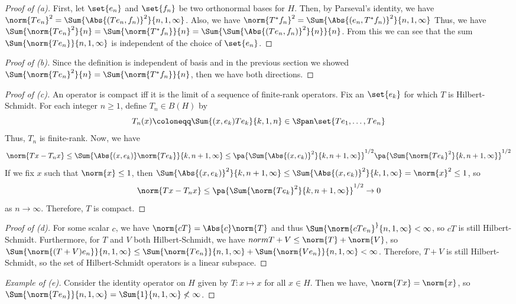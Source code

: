 \documentclass[12pt,letterpaper,twoside]{hmcpset}
\begin{document}
\begin{solution}
  \begin{proof}[Proof of (a)]
    First, let $\set{e_n}$ and $\set{f_n}$ be two orthonormal bases for $H$.
    Then, by Parseval's identity, we have $\norm{Te_n}^2 = \Sum{\Abs{(Te_n,f_n)}^2}{n,1,\infty}$.
    Also, we have $\norm{T^*f_n}^2 = \Sum{\Abs{(e_n,T^*f_n)}^2}{n,1,\infty}$
    Thus, we have $\Sum{\norm{Te_n}^2}{n} = \Sum{\norm{T^*f_n}}{n} = \Sum{\Sum{\Abs{(Te_n,f_n)}^2}{n}}{n}$.
    From this we can see that the sum $\Sum{\norm{Te_n}}{n,1,\infty}$ is independent of the choice of $\set{e_n}$.
  \end{proof}
  \begin{proof}[Proof of (b)]
    Since the definition is independent of basis and in the previous section we showed  $\Sum{\norm{Te_n}^2}{n} = \Sum{\norm{T^*f_n}}{n}$, then we have both directions.
  \end{proof}
  \begin{proof}[Proof of (c)]
    An operator is compact iff it is the limit of a sequence of finite-rank operators.
    Fix an $\set{e_k}$ for which $T$ is Hilbert-Schmidt.
    For each integer $n \geq 1$, define $T_n \in B(H)$ by \[
    T_n(x) \coloneqq \Sum{(x,e_k)Te_k}{k,1,n} \in \Span\set{Te_1,\dotsc,Te_n}
    \]
    Thus, $T_n$ is finite-rank.
    Now, we have \[
    \norm{Tx - T_nx} \leq \Sum{\Abs{(x,e_k)}\norm{Te_k}}{k,n+1,\infty} \leq \pa{\Sum{\Abs{(x,e_k)}^2}{k,n+1,\infty}}^{1/2} \pa{\Sum{\norm{Te_k}^2}{k,n+1,\infty}}^{1/2}
    \]
    If we fix $x$ such that $\norm{x} \leq 1$, then $\Sum{\Abs{(x,e_k)}^2}{k,n+1,\infty} \leq \Sum{\Abs{(x,e_k)}^2}{k,1,\infty} = \norm{x}^2 \leq 1$, so \[
    \norm{Tx - T_nx} \leq \pa{\Sum{\norm{Te_k}^2}{k,n+1,\infty}}^{1/2} \to 0
    \]
    as $n \to \infty$.
    Therefore, $T$ is compact.
  \end{proof}
  \begin{proof}[Proof of (d)]
    For some scalar $c$, we have $\norm{cT}=\Abs{c}\norm{T}$ and thus $\Sum{\norm{cTe_n}^}{n,1,\infty} < \infty$, so $cT$ is still Hilbert-Schmidt.
    Furthermore, for $T$ and $V$ both Hilbert-Schmidt, we have $norm{T+V} \leq \norm{T} + \norm{V}$, so $\Sum{\norm{(T+V)e_n}}{n,1,\infty} \leq \Sum{\norm{Te_n}}{n,1,\infty} + \Sum{\norm{Ve_n}}{n,1,\infty} < \infty$.
    Therefore, $T + V$ is still Hilbert-Schmidt, so the set of Hilbert-Schmidt operators is a linear subspace.
  \end{proof}
  \begin{proof}[Example of (e)]
    Consider the identity operator on $H$ given by $T: x \mapsto x$ for all $x \in H$.
    Then we have, $\norm{Tx} = \norm{x}$, so $\Sum{\norm{Te_n}}{n,1,\infty} = \Sum{1}{n,1,\infty} \not< \infty$.
  \end{proof}
\end{solution}
\end{document}
